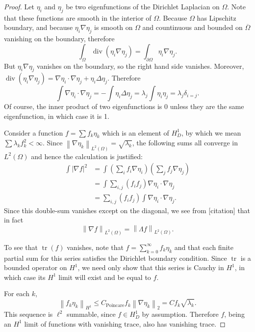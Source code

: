 \documentclass[11pt]{amsart}
\theoremstyle{remark}
\theoremstyle{definition}
\newcommand{\norm}[1]{\left\lVert#1\right\rVert}
\newcommand{\paren}[1]{\left( #1 \right)}
\newcommand{\abs}[1]{\left\lvert #1 \right\rvert}
\DeclareMathOperator{\trace}{tr}
\newcommand{\del}{\partial}
\newcommand{\grad}{\nabla}
\renewcommand{\div}{\operatorname{div}}
\newcommand{\Laplace}{\Delta}
\newcommand{\eigen}[1]{\eta_{#1}} %
\begin{document}
\begin{proof}
Let $\eigen{i}$ and $\eigen{j}$ be two eigenfunctions of the Dirichlet Laplacian on $\Omega$.  Note that these functions are smooth in the interior of $\Omega$.  Because $\Omega$ has Lipschitz boundary, and because $\eigen{i} \grad \eigen{j}$ is smooth on $\Omega$ and countinuous and bounded on $\overline{\Omega}$ vanishing on the boundary, therefore 
\[ \int_\Omega \div(\eigen{i} \grad \eigen{j}) = \int_{\del \Omega} \eigen{i} \grad \eigen{j}. \]
But $\eigen{i} \grad \eigen{j}$ vanishes on the boundary, so the right hand side vanishes.  Moreover, $\div(\eigen{i} \grad \eigen{j}) = \grad \eigen{i} \cdot \grad \eigen{j} + \eigen{i} \Laplace \eigen{j}$.  Therefore
\[ \int \grad \eigen{i} \cdot \grad \eigen{j} = - \int \eigen{i} \Laplace \eigen{j} = \lambda_j \int \eigen{i} \eigen{j} = \lambda_j \delta_{i=j}. \]
Of course, the inner product of two eigenfunctions is 0 unless they are the same eigenfunction, in which case it is 1.  

Consider a function $f = \sum f_k \eigen{k}$ which is an element of $H_D^1$, by which we mean $\sum \lambda_k f_k^2 < \infty$.  Since $\norm{\grad \eigen{k}}_{L^2(\Omega)} = \sqrt{\lambda_k}$, the following sums all converge in $L^2(\Omega)$ and hence the calculation is justified:
\begin{align*}
\int \abs{\grad f}^2 &= \int \paren{\sum_i f_i \grad \eigen{i} } \paren{\sum_j f_j \grad \eigen{j}}
\\ &= \int \sum_{i,j} (f_i f_j) \grad \eigen{i} \cdot \grad \eigen{j}
\\ &= \sum_{i,j} (f_i f_j) \int \grad \eigen{i} \cdot \grad \eigen{j}.
\end{align*}
Since this double-sum vanishes except on the diagonal, we see from [citation] that in fact
\[ \norm{\grad f}_{L^2(\Omega)} = \norm{\Lambda f}_{L^2(\Omega)}. \]

To see that $\trace(f)$ vanishes, note that $f = \sum_{k=0}^\infty f_k \eigen{k}$ and that each finite partial sum for this series satisfies the Dirichlet boundary condition.  Since $\trace$ is a bounded operator on $H^1$, we need only show that this series is Cauchy in $H^1$, in which case its $H^1$ limit will exist and be equal to $f$.  

For each $k$,
\[ \norm{ f_k \eigen{k} }_{H^1} \leq C_\textrm{Poincare} f_k \norm{\grad \eigen{k}}_2 = C f_k \sqrt{\lambda_k}. \]
This sequence is $\ell^2$ summable, since $f \in H_D^1$ by assumption.  Therefore $f$, being an $H^1$ limit of functions with vanishing trace, also has vanishing trace.  
\end{proof}
\end{document}
